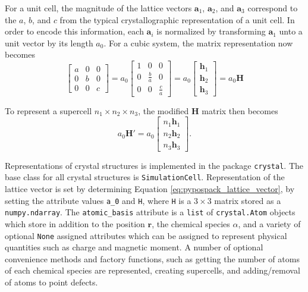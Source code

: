 For a unit cell, the magnitude of the lattice vectors $\bm{a}_1$, $\bm{a}_2$, and $\bm{a}_3$ correspond to the $a$,  $b$, and $c$ from the typical crystallographic representation of a unit cell.  In order to encode this information, each $\bm{a}_i$ is normalized by transforming $\bm{a}_1$ unto a unit vector by its length $a_0$.  For a cubic system, the matrix representation now becomes
\begin{equation}
\label{eq:pypospack_lattice_vector}
	\begin{bmatrix}
		a & 0 & 0 \\
		0 & b & 0 \\
		0 & 0 & c
	\end{bmatrix}
	=
	a_0
	\begin{bmatrix}
		1 & 0 & 0 \\
		0 & \frac{b}{a} & 0 \\
		0 & 0 & \frac{c}{a}
	\end{bmatrix}
	=
	a_0 \begin{bmatrix}
				\bm{h}_1 \\
				\bm{h}_2 \\
				\bm{h}_3
			\end{bmatrix}
	=
	a_0 \bm{H}
\end{equation}

To represent a supercell $n_1 \times n_2 \times n_3$, the modified $\bm{H}$ matrix then becomes
\begin{equation}
\label{eq:pypospack_supercell_representation}
	a_0 \bm{H}'
	=
	a_0 \begin{bmatrix}
	        n_1 \bm{h}_1 \\
					n_2 \bm{h}_2 \\
					n_3 \bm{h}_3
			\end{bmatrix}.
\end{equation}

Representations of crystal structures is implemented in the package \verb|crystal|.  The base class for all crystal structures is \verb|SimulationCell|.  Representation of the lattice vector is set by determining Equation \ref{eq:pypospack_lattice_vector}, by setting the attribute values \verb|a_0| and \verb|H|, where \verb|H| is a $3 \times 3$ matrix stored as a \verb|numpy.ndarray|.  The \verb|atomic_basis| attribute is a \verb|list| of \verb|crystal.Atom| objects which store in addition to the position $\bm{r}$, the chemical species $\alpha$, and a variety of optional \verb|None| assigned attributes which can be assigned to represent physical quantities such as charge and magnetic moment.  A number of optional convenience methods and factory functions, such as getting the number of atoms of each chemical species are represented, creating supercells, and adding/removal of atoms to point defects.

